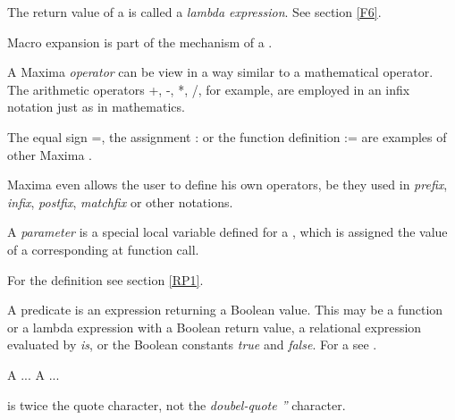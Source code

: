 \documentclass[../Maxima_Workbook.tex]{subfiles}
\begin{document}
\lzz {}

\lz The return value of a  is called a \emph{lambda expression}.   See section \ref{F6}.

\lzz {} 

\lz Macro expansion is part of the mechanism of a .

\lzz {} 

\lz A Maxima \emph{operator} can be view in a way similar to a mathematical operator. The arithmetic operators +, -, *, /, for example, are employed in an infix notation just as in mathematics. 

\lz The equal sign =, the assignment : or the function definition := are examples of other Maxima . 

\lz Maxima even allows the user to define his own operators, be they used in \emph{prefix}, \emph{infix}, \emph{postfix}, \emph{matchfix} or other notations.

\lzz {} 

\lz A \emph{parameter} is a special local variable defined for a , which is assigned the value of a corresponding  at function call.

\lzz {} 

\lz For the definition see section \ref{RP1}.

\lzz {} 

\lz A predicate is an expression returning a Boolean value. This may be a function or a lambda expression with a Boolean return value, a relational expression evaluated by \emph{is}, or the Boolean constants \emph{true} and \emph{false}. For a   see .

\lzz {} 

\lz A  ... A  ...

\lzz {}  is twice the quote character, not the \emph{doubel-quote ''} character.
\end{document}
